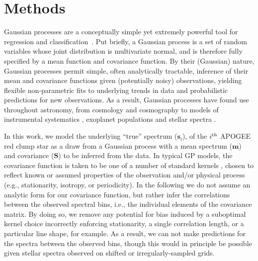 \documentclass[a4paper,fleqn,usenatbib]{mnras}
\newcommand{\specmean}{{\bm m}}
\newcommand{\speccov}{{\bm S}}
\newcommand{\objspec}{{\bm s}}
\begin{document}
\section{Methods}

Gaussian processes are a conceptually simple yet extremely powerful tool for regression and classification~\citep{Rasmussen_Williams}. Put briefly, a Gaussian process is a set of random variables whose joint distribution is multivariate normal, and is therefore fully specified by a mean function and covariance function. By their (Gaussian) nature, Gaussian processes permit simple, often analytically tractable, inference of their mean and covariance functions given (potentially noisy) observations, yielding flexible non-parametric fits to underlying trends in data and probabilistic predictions for new observations. As a result, Gaussian processes have found use throughout astronomy, from cosmology \citep{Bond_etal:1987} and cosmography \citep{Shafieloo_etal:2012} to models of instrumental systematics \citep{Gibson_etal:2012}, exoplanet populations \citep{DFM_etal:2014} and stellar spectra \citep{Czekala_etal:2017}.

In this work, we model the underlying ``true'' spectrum ($\objspec_i$), of the $i^{\rm th}$ APOGEE red clump star as a draw from a Gaussian process with a mean spectrum ($\specmean$) and covariance ($\speccov$) to be inferred from the data. In typical GP models, the covariance function is taken to be one of a number of standard kernels \citep{Rasmussen_Williams}, chosen to reflect known or assumed properties of the observation and/or physical process (e.g., stationarity, isotropy, or periodicity). In the following we do not assume an analytic form for our covariance function, but rather infer the correlations between the observed spectral bins, i.e., the individual elements of the covariance matrix. By doing so, we remove any potential for bias induced by a suboptimal kernel choice incorrectly enforcing stationarity, a single correlation length, or a particular line shape, for example. As a result, we can not make predictions for the spectra between the observed bins, though this would in principle be possible given stellar spectra observed on shifted or irregularly-sampled grids.
\end{document}
